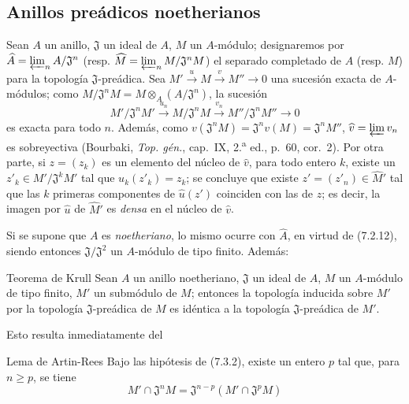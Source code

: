 \subsection{Anillos preádicos noetherianos}
\label{subsection:0.7.3-fr}

\begin{env}[7.3.1]
\label{0.7.3.1-fr}
Sean $A$ un anillo, $\mathfrak J$ un ideal de $A$, $M$ un $A$-módulo;
designaremos por
$\widehat A=\varprojlim_n A/\mathfrak J^n$ (resp.
$\widehat M=\varprojlim_n M/\mathfrak J^nM$) el separado completado de $A$
(resp. $M$) para la topología $\mathfrak J$-preádica. Sea
$M'\xrightarrow{u}M\xrightarrow{v}M''\to0$
una sucesión exacta de $A$-módulos; como
$M/\mathfrak J^nM=M\otimes_A(A/\mathfrak J^n)$, la sucesión
\[
  M'/\mathfrak J^nM'\xrightarrow{u_n}
  M/\mathfrak J^nM\xrightarrow{v_n}
  M''/\mathfrak J^nM''\to0
\]
es exacta para todo $n$. Además, como
$v(\mathfrak J^nM)=\mathfrak J^nv(M)=\mathfrak J^nM''$,
$\widehat v=\varprojlim v_n$ es sobreyectiva (Bourbaki,
\emph{Top. gén.}, cap.~IX, 2.\textsuperscript{a} ed., p.~60, cor.~2).
Por otra parte, si $z=(z_k)$ es un elemento del núcleo de $\widehat v$, para todo
entero $k$, existe un $z'_k\in M'/\mathfrak J^kM'$ tal que
$u_k(z'_k)=z_k$; se concluye que existe
$z'=(z'_n)\in\widehat{M}'$ tal que las $k$ primeras componentes de
$\widehat u(z')$ coinciden con las de $z$; es decir, la imagen por
$\widehat u$ de $\widehat{M}'$ es \emph{densa} en el núcleo de
$\widehat v$.

Si se supone que $A$ es \emph{noetheriano}, lo mismo ocurre con $\widehat A$, en
virtud de (7.2.12), siendo entonces $\mathfrak J/\mathfrak J^2$ un $A$-módulo de
tipo finito. Además:
\end{env}

\begin{namedtheorem}[7.3.2]{Teorema de Krull}
\label{0.7.3.2-fr}
Sean $A$ un anillo \textup{noetheriano}, $\mathfrak J$ un ideal de $A$, $M$ un
$A$-módulo \textup{de tipo finito}, $M'$ un submódulo de $M$; entonces la topología
inducida sobre $M'$ por la topología $\mathfrak J$-preádica de $M$ es idéntica
a la topología $\mathfrak J$-preádica de $M'$.
\end{namedtheorem}

Esto resulta inmediatamente del

\begin{namedlemma}[7.3.2.1]{Lema de Artin-Rees}
\label{0.7.3.2.1-fr}
Bajo las hipótesis de \textup{(7.3.2)}, existe un entero $p$ tal que, para
$n\geq p$, se tiene
\[
  M'\cap\mathfrak J^nM=\mathfrak J^{n-p}
  (M'\cap\mathfrak J^pM)
\]
\end{namedlemma}

